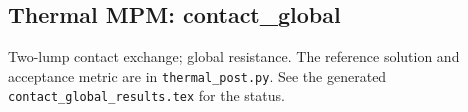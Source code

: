 \subsection{Thermal MPM: contact\_global}
Two-lump contact exchange; global resistance. The reference solution and acceptance metric are in \texttt{thermal\_post.py}. See the generated \texttt{contact\_global\_results.tex} for the status.
